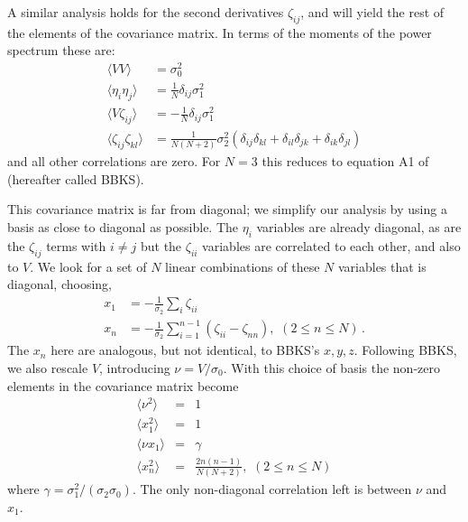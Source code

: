 \documentclass[12pt]{article}
\begin{document}
A similar analysis holds for the second derivatives $\zeta_{ij}$, and will yield the rest of the elements of the covariance matrix. In terms of the moments of the power spectrum these are:
%
\begin{equation} \label{corr}
\begin{split}
\langle VV \rangle &= \sigma_0^2 \\
\langle\eta_i\eta_j\rangle &= \frac{1}{N}\delta_{ij}\sigma_1^2 \\
\langle V\zeta_{ij}\rangle &= -\frac{1}{N}\delta_{ij}\sigma_1^2 \\
\langle\zeta_{ij}\zeta_{kl}\rangle &= \frac{1}{N(N+2)}\sigma_2^2(\delta_{ij}\delta_{kl}+\delta_{il}\delta_{jk}+\delta_{ik}\delta_{jl})
\end{split}
\end{equation}
%
and all other correlations are zero. For $N=3$ this reduces to equation A1 of \cite{BBKS} (hereafter called BBKS).

This covariance matrix is far from diagonal; we simplify our analysis by using a basis as close to diagonal as possible. The $\eta_i$ variables are already diagonal, as are the $\zeta_{ij}$ terms with $i\neq j$ but the $\zeta_{ii}$ variables are correlated to each other, and also  to $V$. We look for a set of $N$ linear combinations of these $N$ variables that is diagonal, choosing,
\begin{align}
\label{BasisTransform}
x_1 &= -\frac{1}{\sigma_2}\sum_i\zeta_{ii} \nonumber \\
x_n &= -\frac{1}{\sigma_2}\sum_{i=1}^{n-1}\left(\zeta_{ii}-\zeta_{nn}\right),\,\, (2\leq n \leq N) \, .
\end{align}
%
The $x_n$ here are analogous, but not identical, to BBKS's $x, y, z$. Following BBKS, we also rescale $V$, introducing $\nu = V/\sigma_0$. With this choice of basis the non-zero elements in the covariance matrix become
%
\begin{eqnarray}
  \langle\nu^2\rangle &=& 1 \nonumber\\
  \langle x_1^2\rangle&=&1 \\
  \langle\nu x_1\rangle &=& \gamma \nonumber\\
  \langle x_n^2 \rangle &=& \frac{2n(n-1)}{N(N+2)},\,\, (2\leq n \leq N) \nonumber
\end{eqnarray}
%
\noindent where $\gamma = \sigma_1^2/(\sigma_2 \sigma_0)$. The only non-diagonal correlation left is between $\nu$ and $x_1$.
\end{document}

